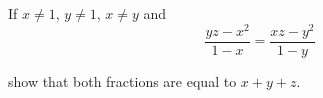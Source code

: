 If $ x\neq1$,  $ y\neq1$,  $ x\neq y$ and\[ \frac{yz-x^{2}}{1-x}=\frac{xz-y^{2}}{1-y}\]

show that both fractions are equal to $ x+y+z$.